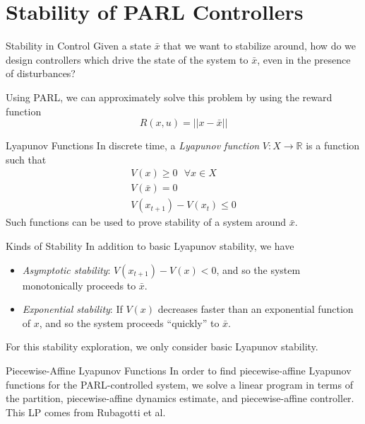 \documentclass{beamer}
\begin{document}
\section{Stability of PARL Controllers}

\begin{frame}{Stability in Control}
  Given a state $\bar{x}$ that we want to stabilize around, how do we design
  controllers which drive the state of the system to $\bar{x}$, even in the
  presence of disturbances?

  Using PARL, we can approximately solve this problem by using the reward function
  \begin{equation*}
    R(x, u) = ||x - \bar{x}||
  \end{equation*}
\end{frame}

\begin{frame}{Lyapunov Functions}
  In discrete time, a \emph{Lyapunov function} $V: X \rightarrow \mathbb{R}$ is a function such that
  \begin{align}
    V(x) \geq 0 \text{ } \forall x \in X \\
    V(\bar{x}) = 0  \\
    V(x_{t+1}) - V(x_t) \leq 0
  \end{align}
  Such functions can be used to prove stability of a system around $\bar{x}$.
\end{frame}

\begin{frame}{Kinds of Stability}
  In addition to basic Lyapunov stability, we have
  \begin{itemize}
    \item \emph{Asymptotic stability}: $V(x_{t+1}) - V(x) < 0$, and so the system monotonically proceeds to $\bar{x}$.
    \item \emph{Exponential stability}: If $V(x)$ decreases faster than an exponential function of $x$, and so the system proceeds ``quickly'' to $\bar{x}$.
  \end{itemize}
  For this stability exploration, we only consider basic Lyapunov stability.
\end{frame}

\begin{frame}{Piecewise-Affine Lyapunov Functions}
  In order to find piecewise-affine Lyapunov functions for the PARL-controlled
  system, we solve a linear program in terms of the partition, piecewise-affine
  dynamics estimate, and piecewise-affine controller. This LP comes from Rubagotti et al.
\end{frame}
\end{document}
